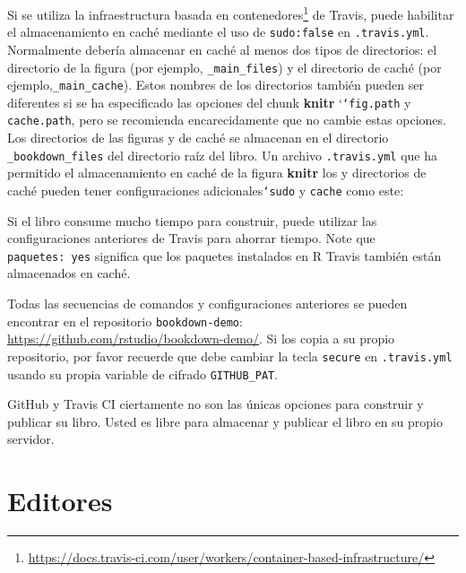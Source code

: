 \documentclass[12pt,]{krantz}
\makeatletter
\newenvironment{Shaded}{\begin{snugshade}}{\end{snugshade}}
\newcommand{\KeywordTok}[1]{\textcolor[rgb]{0.13,0.29,0.53}{\textbf{{#1}}}}
\newcommand{\FunctionTok}[1]{\textcolor[rgb]{0.00,0.00,0.00}{{#1}}}
\newcommand{\NormalTok}[1]{{#1}}
\renewcommand{\href}[2]{#2\footnote{\url{#1}}}
\newenvironment{kframe}{%
\medskip{}
\setlength{\fboxsep}{.8em}
 \def\at@end@of@kframe{}%
 \ifinner\ifhmode%
  \def\at@end@of@kframe{\end{minipage}}%
  \begin{minipage}{\columnwidth}%
 \fi\fi%
 \def\FrameCommand##1{\hskip\@totalleftmargin \hskip-\fboxsep
 \colorbox{shadecolor}{##1}\hskip-\fboxsep
     \hskip-\linewidth \hskip-\@totalleftmargin \hskip\columnwidth}%
 \MakeFramed {\advance\hsize-\width
   \@totalleftmargin\z@ \linewidth\hsize
   \@setminipage}}%
 {\par\unskip\endMakeFramed%
 \at@end@of@kframe}
\renewenvironment{Shaded}{\begin{kframe}}{\end{kframe}}
\theoremstyle{definition}
\theoremstyle{definition}
\theoremstyle{remark}
\makeatother
\begin{document}
Si se utiliza la
\href{https://docs.travis-ci.com/user/workers/container-based-infrastructure/}{infraestructura
basada en contenedores} de Travis, puede habilitar el almacenamiento en
caché mediante el uso de \texttt{sudo:false} en \texttt{.travis.yml}.
Normalmente debería almacenar en caché al menos dos tipos de
directorios: el directorio de la figura (por ejemplo,
\texttt{\_main\_files}) y el directorio de caché (por
ejemplo,\texttt{\_main\_cache}). Estos nombres de los directorios
también pueden ser diferentes si se ha especificado las opciones del
chunk \textbf{knitr} `\texttt{`fig.path} y \texttt{cache.path}, pero se
recomienda encarecidamente que no cambie estas opciones. Los directorios
de las figuras y de caché se almacenan en el directorio
\texttt{\_bookdown\_files} del directorio raíz del libro. Un archivo
\texttt{.travis.yml} que ha permitido el almacenamiento en caché de la
figura \textbf{knitr} los y directorios de caché pueden tener
configuraciones adicionales\texttt{`sudo} y \texttt{cache} como este:

\begin{Shaded}
\end{Shaded}

Si el libro consume mucho tiempo para construir, puede utilizar las
configuraciones anteriores de Travis para ahorrar tiempo. Note que
\texttt{paquetes:\ yes} significa que los paquetes instalados en R
Travis también están almacenados en caché.

Todas las secuencias de comandos y configuraciones anteriores se pueden
encontrar en el repositorio \texttt{bookdown-demo}:
\url{https://github.com/rstudio/bookdown-demo/}. Si los copia a su
propio repositorio, por favor recuerde que debe cambiar la tecla
\texttt{secure} en \texttt{.travis.yml} usando su propia variable de
cifrado \texttt{GITHUB\_PAT}.

GitHub y Travis CI ciertamente no son las únicas opciones para construir
y publicar su libro. Usted es libre para almacenar y publicar el libro
en su propio servidor.

\section{Editores}\label{editores}
\end{document}
